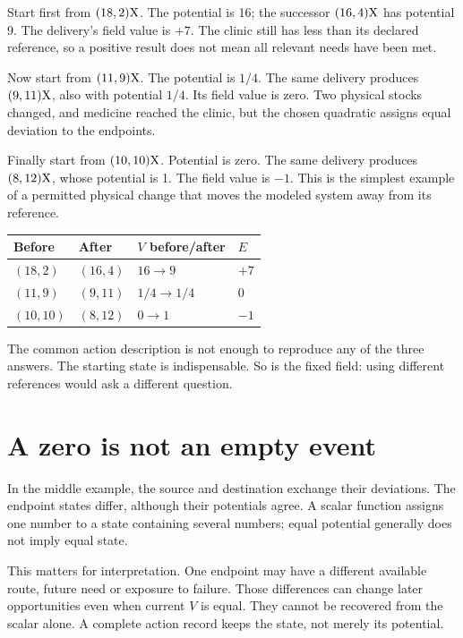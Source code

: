 Start first from $(18,2)\mathrm{X}$. The potential is 16; the successor $(16,4)\mathrm{X}$ has potential 9. The delivery's field value is $+7$. The clinic still has less than its declared reference, so a positive result does not mean all relevant needs have been met.

Now start from $(11,9)\mathrm{X}$. The potential is $1/4$. The same delivery produces $(9,11)\mathrm{X}$, also with potential $1/4$. Its field value is zero. Two physical stocks changed, and medicine reached the clinic, but the chosen quadratic assigns equal deviation to the endpoints.

Finally start from $(10,10)\mathrm{X}$. Potential is zero. The same delivery produces $(8,12)\mathrm{X}$, whose potential is 1. The field value is $-1$. This is the simplest example of a permitted physical change that moves the modeled system away from its reference.

\begin{center}
\begin{tabular}{llll}\toprule
Before & After & $V$ before/after & $E$\\\midrule
$(18,2)$ & $(16,4)$ & $16\to9$ & $+7$\\
$(11,9)$ & $(9,11)$ & $1/4\to1/4$ & $0$\\
$(10,10)$ & $(8,12)$ & $0\to1$ & $-1$\\\bottomrule
\end{tabular}
\end{center}

The common action description is not enough to reproduce any of the three answers. The starting state is indispensable. So is the fixed field: using different references would ask a different question.

\section{A zero is not an empty event}
In the middle example, the source and destination exchange their deviations. The endpoint states differ, although their potentials agree. A scalar function assigns one number to a state containing several numbers; equal potential generally does not imply equal state.

This matters for interpretation. One endpoint may have a different available route, future need or exposure to failure. Those differences can change later opportunities even when current $V$ is equal. They cannot be recovered from the scalar alone. A complete action record keeps the state, not merely its potential.

